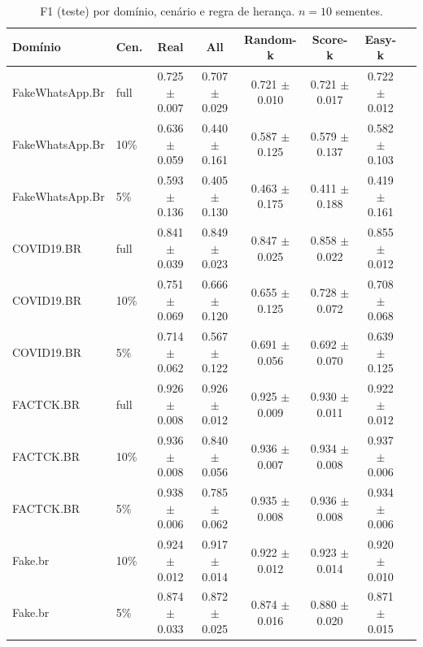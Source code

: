 \documentclass[conference]{IEEEtran}
\begin{document}
\begin{table}[t]
\caption{F1 (teste) por dom\'inio, cen\'ario e regra de heran\c{c}a. $n{=}10$ sementes.}\label{tab:f1}
\centering
\footnotesize
\setlength{\tabcolsep}{6pt}
\begin{tabular}{@{}llcccccc@{}}
\toprule
Dom\'inio & Cen. & Real & All & Random-k & Score-k & Easy-k \\
\midrule
FakeWhatsApp.Br & full & 0.725 $\pm$ 0.007 & 0.707 $\pm$ 0.029 & 0.721 $\pm$ 0.010 & 0.721 $\pm$ 0.017 & 0.722 $\pm$ 0.012 \\
FakeWhatsApp.Br & 10\% & 0.636 $\pm$ 0.059 & 0.440 $\pm$ 0.161 & 0.587 $\pm$ 0.125 & 0.579 $\pm$ 0.137 & 0.582 $\pm$ 0.103 \\
FakeWhatsApp.Br & 5\% & 0.593 $\pm$ 0.136 & 0.405 $\pm$ 0.130 & 0.463 $\pm$ 0.175 & 0.411 $\pm$ 0.188 & 0.419 $\pm$ 0.161 \\
COVID19.BR & full & 0.841 $\pm$ 0.039 & 0.849 $\pm$ 0.023 & 0.847 $\pm$ 0.025 & 0.858 $\pm$ 0.022 & 0.855 $\pm$ 0.012 \\
COVID19.BR & 10\% & 0.751 $\pm$ 0.069 & 0.666 $\pm$ 0.120 & 0.655 $\pm$ 0.125 & 0.728 $\pm$ 0.072 & 0.708 $\pm$ 0.068 \\
COVID19.BR & 5\% & 0.714 $\pm$ 0.062 & 0.567 $\pm$ 0.122 & 0.691 $\pm$ 0.056 & 0.692 $\pm$ 0.070 & 0.639 $\pm$ 0.125 \\
FACTCK.BR & full & 0.926 $\pm$ 0.008 & 0.926 $\pm$ 0.012 & 0.925 $\pm$ 0.009 & 0.930 $\pm$ 0.011 & 0.922 $\pm$ 0.012 \\
FACTCK.BR & 10\% & 0.936 $\pm$ 0.008 & 0.840 $\pm$ 0.056 & 0.936 $\pm$ 0.007 & 0.934 $\pm$ 0.008 & 0.937 $\pm$ 0.006 \\
FACTCK.BR & 5\% & 0.938 $\pm$ 0.006 & 0.785 $\pm$ 0.062 & 0.935 $\pm$ 0.008 & 0.936 $\pm$ 0.008 & 0.934 $\pm$ 0.006 \\
Fake.br & 10\% & 0.924 $\pm$ 0.012 & 0.917 $\pm$ 0.014 & 0.922 $\pm$ 0.012 & 0.923 $\pm$ 0.014 & 0.920 $\pm$ 0.010 \\
Fake.br & 5\% & 0.874 $\pm$ 0.033 & 0.872 $\pm$ 0.025 & 0.874 $\pm$ 0.016 & 0.880 $\pm$ 0.020 & 0.871 $\pm$ 0.015 \\
\bottomrule
\end{tabular}
\end{table}
\end{document}
